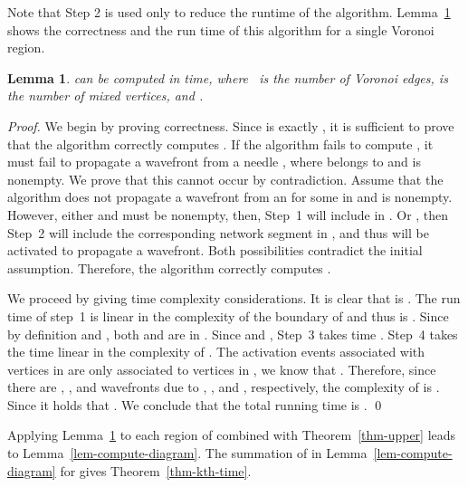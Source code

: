 \documentclass[11pt]{llncs}
\newtheorem{Lemma}{Lemma}
\begin{document}
Note that Step 2 is used only to reduce the runtime of the algorithm.
Lemma~\ref{lem-compute-region} shows the correctness and the run time of this algorithm for a single Voronoi region.

\newcommand{\lemcomputeregion}{ can be computed in  time,
where~ is the number of Voronoi edges,  is the number of mixed vertices,
and .
}



\begin{Lemma}\label{lem-compute-region}
\lemcomputeregion
\end{Lemma}
\begin{proof}
We begin by proving correctness.
Since  is exactly  \cite{Lee-82},
it is sufficient to prove that the algorithm correctly computes .
If the algorithm fails to compute ,
it must fail to propagate a wavefront from a needle , where  belongs to  and
 is nonempty.
We prove that this cannot occur by contradiction. Assume that the algorithm does not propagate a wavefront from an  for some  in  and  is nonempty.
However, either  and  must be nonempty, then,
Step~1 will include  in .
Or , then
Step~2 will include the corresponding network segment in ,
and thus  will be activated to propagate a wavefront.
Both possibilities contradict the initial assumption.
Therefore, the algorithm correctly computes .


We proceed by giving time complexity considerations.
It is clear that  is .
The run time of step~1 is linear in the complexity of the boundary of 
and thus is .
Since by definition  and ,
both  and  are in .
Since  and  ,
Step~3 takes  time \cite{BKC-09}.
Step~4 takes the time linear in the complexity of .
The activation events associated with vertices in  are only associated to vertices in , we know that .
Therefore, since there are , , and  wavefronts
due to , , and , respectively,
the complexity of  is .
Since  it holds that .
We conclude that the total running time is  .
\qed
\end{proof}



Applying Lemma~\ref{lem-compute-region} to each region of  combined with Theorem~\ref{thm-upper}
leads to Lemma~\ref{lem-compute-diagram}.
The summation of  in Lemma~\ref{lem-compute-diagram} for 
gives Theorem~\ref{thm-kth-time}.

\newcommand{\lemcomputediagramtext}
{
 can be computed from  in  time.
}
\end{document}
